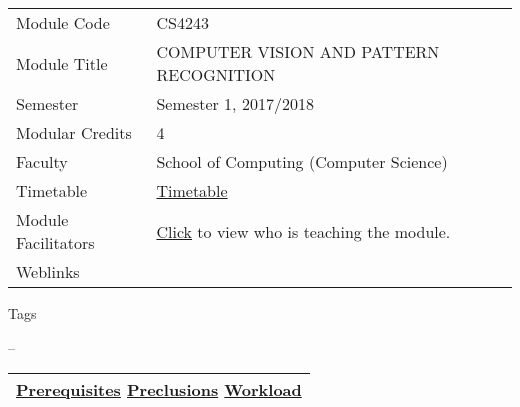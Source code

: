 \hypertarget{ctl00_ctl00_ContentPlaceHolder1_ContentPlaceHolder1_LV_itemPlaceholderContainer}{}
\begin{longtable}[]{@{}ll@{}}
\toprule
\protect\hypertarget{ctl00_ctl00_ContentPlaceHolder1_ContentPlaceHolder1_LV_ctrl0_txtCode}{}{Module
Code} &
\protect\hypertarget{ctl00_ctl00_ContentPlaceHolder1_ContentPlaceHolder1_LV_ctrl0_lcCode}{}{CS4243}\tabularnewline
\protect\hypertarget{ctl00_ctl00_ContentPlaceHolder1_ContentPlaceHolder1_LV_ctrl0_lcCourse}{}{Module
Title} &
\protect\hypertarget{ctl00_ctl00_ContentPlaceHolder1_ContentPlaceHolder1_LV_ctrl0_lcCourseName}{}{COMPUTER
VISION AND PATTERN RECOGNITION}\tabularnewline
\protect\hypertarget{ctl00_ctl00_ContentPlaceHolder1_ContentPlaceHolder1_LV_ctrl0_lcSemester}{}{Semester}
&
\protect\hypertarget{ctl00_ctl00_ContentPlaceHolder1_ContentPlaceHolder1_LV_ctrl0_lcSem}{}{Semester
1, 2017/2018}\tabularnewline
\protect\hypertarget{ctl00_ctl00_ContentPlaceHolder1_ContentPlaceHolder1_LV_ctrl0_lcModCredit}{}{Modular
Credits} &
\protect\hypertarget{ctl00_ctl00_ContentPlaceHolder1_ContentPlaceHolder1_LV_ctrl0_lcModC}{}{4}\tabularnewline
\protect\hypertarget{ctl00_ctl00_ContentPlaceHolder1_ContentPlaceHolder1_LV_ctrl0_lcFaculty}{}{Faculty}
&
\protect\hypertarget{ctl00_ctl00_ContentPlaceHolder1_ContentPlaceHolder1_LV_ctrl0_lcFac}{}{School
of Computing (Computer Science)}\tabularnewline
\protect\hypertarget{ctl00_ctl00_ContentPlaceHolder1_ContentPlaceHolder1_LV_ctrl0_Label1}{}{Timetable}
&
\protect\hypertarget{ctl00_ctl00_ContentPlaceHolder1_ContentPlaceHolder1_LV_ctrl0_Span1}{}{\href{javascript:void(0);}{Timetable}}\tabularnewline
\protect\hypertarget{ctl00_ctl00_ContentPlaceHolder1_ContentPlaceHolder1_LV_ctrl0_Label6}{}{Module
Facilitators} &
\protect\hypertarget{ctl00_ctl00_ContentPlaceHolder1_ContentPlaceHolder1_LV_ctrl0_Span2}{}{\href{list_lecturers.aspx?CourseID=29e8cc71-78dd-4928-b08c-cb4ffd1caae9\&ClickFrom=}{Click}
to view who is teaching the module.}\tabularnewline
\protect\hypertarget{ctl00_ctl00_ContentPlaceHolder1_ContentPlaceHolder1_LV_ctrl0_LabelCtrl1}{}{Weblinks}
&\tabularnewline
\bottomrule
\end{longtable}

\protect\hypertarget{ctl00_ctl00_ContentPlaceHolder1_ContentPlaceHolder1_LV_ctrl0_Label4}{}{Tags}

\protect\hypertarget{ctl00_ctl00_ContentPlaceHolder1_ContentPlaceHolder1_LV_ctrl0_lblTags}{}{--}

\begin{longtable}[]{@{}l@{}}
\toprule
\protect\hypertarget{ctl00_ctl00_ContentPlaceHolder1_ContentPlaceHolder1_lblSectionMiddle}{}{\protect\hyperlink{Prerequisites}{Prerequisites}
\textbar{} \protect\hyperlink{Preclusions}{Preclusions} \textbar{}
\protect\hyperlink{Workload}{Workload}}\tabularnewline
\bottomrule
\end{longtable}

